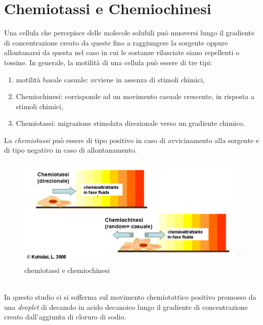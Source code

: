 \section{Chemiotassi e Chemiochinesi}
\label{sec:456}
Una cellula che percepisce delle molecole solubili può muoversi lungo il gradiente di concentrazione creato da queste fino a raggiungere la sorgente oppure allontanarsi da questa nel caso in cui le sostanze rilasciate siano repellenti o tossine. 
In generale, la motilità di una cellula può essere di tre tipi:
\begin{enumerate}
\item motilità basale casuale: avviene in assenza di stimoli chimici,
\item Chemiochinesi: corrisponde ad un movimento casuale crescente, in risposta a stimoli chimici,
\item Chemiotassi: migrazione stimolata direzionale verso un gradiente chimico.
\end{enumerate}
La \emph{chemiotassi} può essere di tipo positivo in caso di avvicinamento alla sorgente e di tipo negativo in caso di allontanamento.
	\begin{figure}[h]
	  \includegraphics[scale=0.50]{immagini/chemochin.png}
		\centering	
	 \caption{chemiotassi e chemiochinesi}
	\end{figure}
\\In questo studio ci si sofferma sul movimento chemiotattico positivo promosso da una \emph{droplet} di decanolo in acido decanoico lungo il gradiente di concentrazione creato dall'aggiunta di cloruro di sodio.

